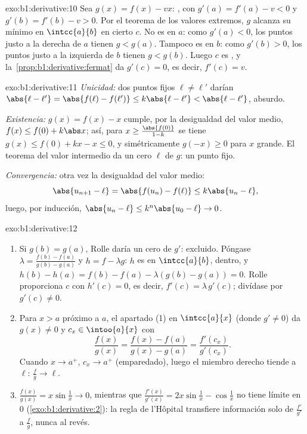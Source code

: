 \begin{solution}{exo:b1:derivative:10}
Sea $g(x) = f(x) - vx$: , con $g'(a) = f'(a) - v < 0$ y
$g'(b) = f'(b) - v > 0$. Por el teorema de los valores extremos, $g$
alcanza su mínimo en $\intcc{a}{b}$ en cierto $c$. No es en $a$:
como $g'(a) < 0$, los puntos justo a la derecha de $a$ tienen
$g < g(a)$. Tampoco es en $b$: como $g'(b) > 0$, los puntos justo a
la izquierda de $b$ tienen $g < g(b)$. Luego $c$ es , y
la~\cref{prop:b1:derivative:fermat} da $g'(c) = 0$, es decir,
$f'(c) = v$.
\end{solution}

\begin{solution}{exo:b1:derivative:11}
\emph{Unicidad:} dos puntos fijos $\ell \neq \ell'$ darían
$\abs{\ell - \ell'} = \abs{f(\ell) - f(\ell')} \leq k\abs{\ell -
\ell'} < \abs{\ell - \ell'}$, absurdo.

\emph{Existencia:} $g(x) = f(x) - x$ cumple, por la desigualdad del
valor medio, $f(x) \leq f(0) + k\abs x$; así, para
$x \geq \frac{\abs{f(0)}}{1 - k}$ se tiene
$g(x) \leq f(0) + kx - x \leq 0$, y simétricamente $g(-x) \geq 0$
para $x$ grande. El teorema del valor intermedio da un cero $\ell$ de
$g$: un punto fijo.

\emph{Convergencia:} otra vez la desigualdad del valor medio:
\[
\abs{u_{n+1} - \ell} = \abs{f(u_n) - f(\ell)} \leq k\abs{u_n - \ell},
\]
luego, por inducción, $\abs{u_n - \ell} \leq k^n \abs{u_0 - \ell} \to 0$.
\end{solution}

\begin{solution}{exo:b1:derivative:12}
\begin{enumerate}
  \item Si $g(b) = g(a)$, Rolle daría un cero  de $g'$:
        excluido. Póngase $\lambda = \frac{f(b) - f(a)}{g(b) -
        g(a)}$ y $h = f - \lambda g$: $h$ es  en
        $\intcc{a}{b}$,  dentro, y $h(b) - h(a)
        = f(b) - f(a) - \lambda(g(b) - g(a)) = 0$. Rolle
        proporciona $c$ con $h'(c) = 0$, es decir, $f'(c) =
        \lambda\,g'(c)$; divídase por $g'(c) \neq 0$.
  \item Para $x > a$ próximo a $a$, el apartado (1) en
        $\intcc{a}{x}$ (donde $g' \neq 0$) da $g(x) \neq 0$ y
        $c_x \in \intoo{a}{x}$ con
        \[
        \frac{f(x)}{g(x)} = \frac{f(x) - f(a)}{g(x) - g(a)}
        = \frac{f'(c_x)}{g'(c_x)} .
        \]
        Cuando $x \to a^+$, $c_x \to a^+$ (emparedado), luego el
        miembro derecho tiende a $\ell$: $\frac{f}{g} \to \ell$.
  \item $\frac{f(x)}{g(x)} = x\sin\frac1x \to 0$, mientras que
        $\frac{f'(x)}{g'(x)} = 2x\sin\frac1x - \cos\frac1x$ no
        tiene límite en $0$ (\cref{exo:b1:derivative:2}): la regla
        de l'Hôpital transfiere información solo de
        $\frac{f'}{g'}$ a $\frac fg$, nunca al revés.
\end{enumerate}
\end{solution}

